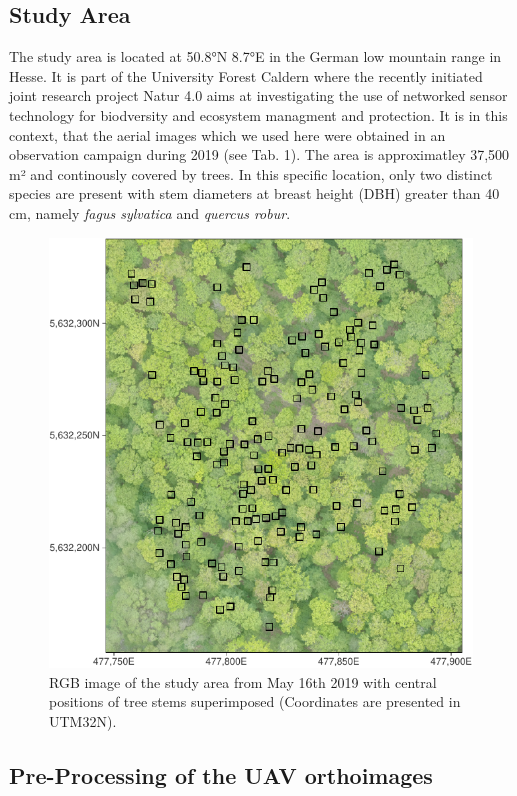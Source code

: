\documentclass[]{article}
\begin{document}
\hypertarget{study-area}{%
\subsection{Study Area}\label{study-area}}

The study area is located at 50.8°N 8.7°E in the German low mountain
range in Hesse. It is part of the University Forest Caldern where the
recently initiated joint research project Natur 4.0 aims at
investigating the use of networked sensor technology for biodversity and
ecosystem managment and protection. It is in this context, that the
aerial images which we used here were obtained in an observation
campaign during 2019 (see Tab. 1). The area is approximatley 37,500 m²
and continously covered by trees. In this specific location, only two
distinct species are present with stem diameters at breast height (DBH)
greater than 40 cm, namely \emph{fagus sylvatica} and \emph{quercus
robur}.

\begin{figure}[H]

{\centering \includegraphics[width=0.7\linewidth]{report_files/figure-latex/plot_aoi-1} 

}

\caption{RGB image of the study area from May 16th 2019 with central positions of tree stems superimposed (Coordinates are presented in UTM32N).}\label{fig:plot_aoi}
\end{figure}

\hypertarget{pre-processing-of-the-uav-orthoimages}{%
\subsection{Pre-Processing of the UAV
orthoimages}\label{pre-processing-of-the-uav-orthoimages}}
\end{document}
